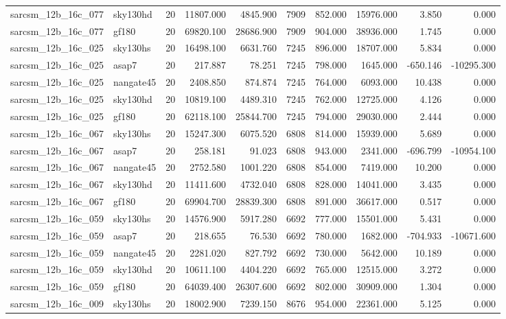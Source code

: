 \documentclass{article}
\begin{document}
\begin{longtable}{llrrrrrrrr}
sarcsm\_12b\_16c\_077 & sky130hd & 20 & 11807.000 & 4845.900 & 7909 & 852.000 & 15976.000 & 3.850 & 0.000 \\
sarcsm\_12b\_16c\_077 & gf180 & 20 & 69820.100 & 28686.900 & 7909 & 904.000 & 38936.000 & 1.745 & 0.000 \\
sarcsm\_12b\_16c\_025 & sky130hs & 20 & 16498.100 & 6631.760 & 7245 & 896.000 & 18707.000 & 5.834 & 0.000 \\
sarcsm\_12b\_16c\_025 & asap7 & 20 & 217.887 & 78.251 & 7245 & 798.000 & 1645.000 & -650.146 & -10295.300 \\
sarcsm\_12b\_16c\_025 & nangate45 & 20 & 2408.850 & 874.874 & 7245 & 764.000 & 6093.000 & 10.438 & 0.000 \\
sarcsm\_12b\_16c\_025 & sky130hd & 20 & 10819.100 & 4489.310 & 7245 & 762.000 & 12725.000 & 4.126 & 0.000 \\
sarcsm\_12b\_16c\_025 & gf180 & 20 & 62118.100 & 25844.700 & 7245 & 794.000 & 29030.000 & 2.444 & 0.000 \\
sarcsm\_12b\_16c\_067 & sky130hs & 20 & 15247.300 & 6075.520 & 6808 & 814.000 & 15939.000 & 5.689 & 0.000 \\
sarcsm\_12b\_16c\_067 & asap7 & 20 & 258.181 & 91.023 & 6808 & 943.000 & 2341.000 & -696.799 & -10954.100 \\
sarcsm\_12b\_16c\_067 & nangate45 & 20 & 2752.580 & 1001.220 & 6808 & 854.000 & 7419.000 & 10.200 & 0.000 \\
sarcsm\_12b\_16c\_067 & sky130hd & 20 & 11411.600 & 4732.040 & 6808 & 828.000 & 14041.000 & 3.435 & 0.000 \\
sarcsm\_12b\_16c\_067 & gf180 & 20 & 69904.700 & 28839.300 & 6808 & 891.000 & 36617.000 & 0.517 & 0.000 \\
sarcsm\_12b\_16c\_059 & sky130hs & 20 & 14576.900 & 5917.280 & 6692 & 777.000 & 15501.000 & 5.431 & 0.000 \\
sarcsm\_12b\_16c\_059 & asap7 & 20 & 218.655 & 76.530 & 6692 & 780.000 & 1682.000 & -704.933 & -10671.600 \\
sarcsm\_12b\_16c\_059 & nangate45 & 20 & 2281.020 & 827.792 & 6692 & 730.000 & 5642.000 & 10.189 & 0.000 \\
sarcsm\_12b\_16c\_059 & sky130hd & 20 & 10611.100 & 4404.220 & 6692 & 765.000 & 12515.000 & 3.272 & 0.000 \\
sarcsm\_12b\_16c\_059 & gf180 & 20 & 64039.400 & 26307.600 & 6692 & 802.000 & 30909.000 & 1.304 & 0.000 \\
sarcsm\_12b\_16c\_009 & sky130hs & 20 & 18002.900 & 7239.150 & 8676 & 954.000 & 22361.000 & 5.125 & 0.000 \\

\end{longtable}
\end{document}
